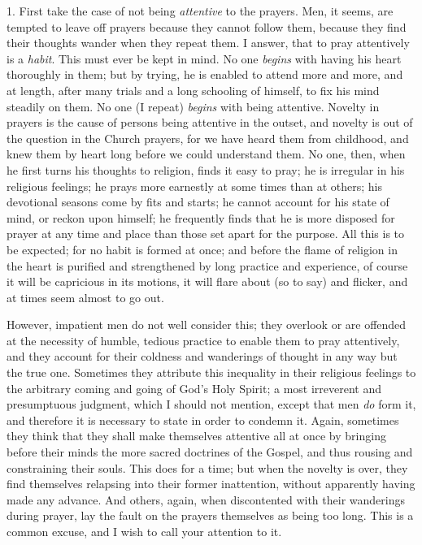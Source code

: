 1. First take the case of not being \emph{attentive}
to the prayers. Men, it seems, are tempted to leave off
prayers because they cannot follow them, because they
find their thoughts wander when they repeat them. I
answer, that to pray attentively is a \emph{habit}. This
must ever be kept in mind. No one \emph{begins} with
having his heart thoroughly in them; but by trying, he is
enabled to attend more and more, and at length, after
many trials and a long schooling of himself, to fix his
mind steadily on them. No one (I repeat) \emph{begins}
with being attentive. Novelty in prayers is the cause of
persons being attentive in the outset, and novelty is out
of the question in the Church prayers, for we have heard
them from childhood, and knew them by heart long before
we could understand them. No one, then, when he first
turns his thoughts to religion, finds it easy to pray; he
is irregular in his religious feelings; he prays more
earnestly at some times than at others; his devotional
seasons come by fits and starts; he cannot account for
his state of mind, or reckon upon himself; he frequently
finds that he is more disposed for prayer at any time and
place than those set apart for the purpose. All this is
to be expected; for no habit is formed at once; and
before the flame of religion in the heart is purified and
strengthened by long practice and experience, of course
it will be capricious in its motions, it will flare about
(so to say) and flicker, and at times seem almost to go
out.

However, impatient men do not well consider this; they
overlook or are offended at the necessity of humble, tedious practice to enable them to pray attentively, and
they account for their coldness and wanderings of thought
in any way but the true one. Sometimes they attribute
this inequality in their religious feelings to the
arbitrary coming and going of God's Holy Spirit; a most
irreverent and presumptuous judgment, which I should not
mention, except that men \emph{do} form it, and therefore
it is necessary to state in order to condemn it. Again,
sometimes they think that they shall make themselves
attentive all at once by bringing before their minds the
more sacred doctrines of the Gospel, and thus rousing and
constraining their souls. This does for a time; but when
the novelty is over, they find themselves relapsing into
their former inattention, without apparently having made
any advance. And others, again, when discontented with
their wanderings during prayer, lay the fault on the
prayers themselves as being too long. This is a common
excuse, and I wish to call your attention to it.

